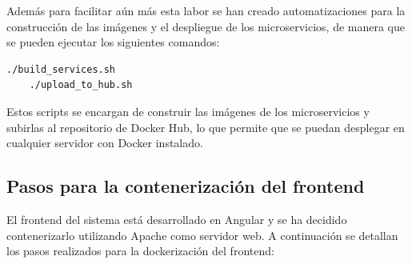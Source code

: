 Además para facilitar aún más esta labor se han creado automatizaciones para la construcción de las imágenes y el despliegue de los microservicios, de manera que se pueden ejecutar los siguientes comandos:
\begin{lstlisting}[language=bash]
    ./build_services.sh 
    ./upload_to_hub.sh
\end{lstlisting}

Estos scripts se encargan de construir las imágenes de los microservicios y subirlas al repositorio de Docker Hub, lo que permite que se puedan desplegar en cualquier servidor con Docker instalado.

\subsection{Pasos para la contenerización del frontend}

El frontend del sistema está desarrollado en Angular y se ha decidido contenerizarlo utilizando Apache como servidor web. A continuación se detallan los pasos realizados para la dockerización del frontend:

